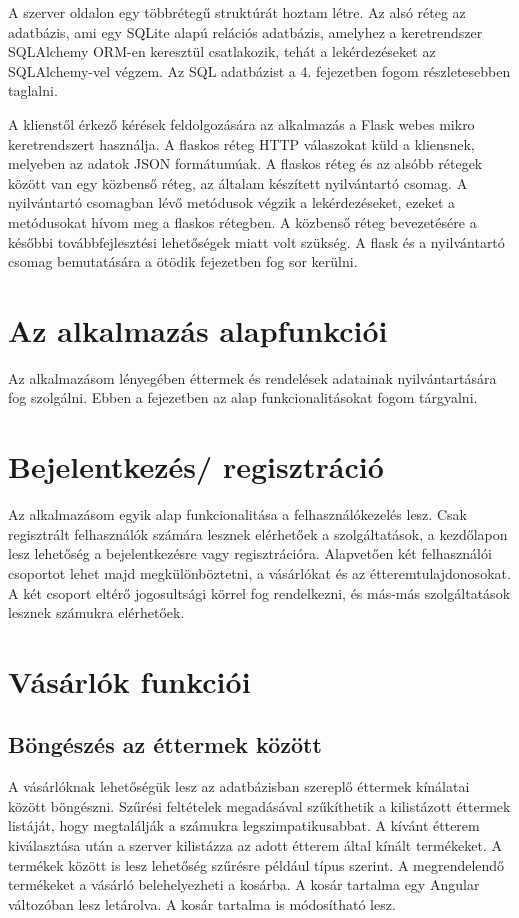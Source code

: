 A szerver oldalon egy többrétegű struktúrát hoztam létre. Az alsó réteg az adatbázis, ami egy SQLite alapú relációs adatbázis, amelyhez a keretrendszer SQLAlchemy ORM-en keresztül csatlakozik, tehát a lekérdezéseket az SQLAlchemy-vel végzem. Az SQL adatbázist a 4. fejezetben fogom részletesebben taglalni.

A klienstől érkező kérések feldolgozására az alkalmazás a Flask webes mikro keretrendszert használja. A flaskos réteg HTTP válaszokat küld a kliensnek, melyeben az adatok JSON formátumúak. A flaskos réteg és az alsóbb rétegek között van egy közbenső réteg, az általam készített nyilvántartó csomag. A nyilvántartó csomagban lévő metódusok végzik a lekérdezéseket, ezeket a metódusokat hívom meg a flaskos rétegben. A közbenső réteg bevezetésére a későbbi továbbfejlesztési lehetőségek miatt volt szükség. A flask és a nyilvántartó csomag bemutatására a ötödik fejezetben fog sor kerülni.

\section{Az alkalmazás alapfunkciói}

Az alkalmazásom lényegében éttermek és rendelések adatainak nyilvántartására fog szolgálni. Ebben a fejezetben az alap funkcionalitásokat fogom tárgyalni.

\section{Bejelentkezés/ regisztráció}

Az alkalmazásom egyik alap funkcionalitása a felhasználókezelés lesz. Csak regisztrált felhasználók számára lesznek elérhetőek a szolgáltatások, a kezdőlapon lesz lehetőség a bejelentkezésre vagy regisztrációra. Alapvetően két felhasználói csoportot lehet majd megkülönböztetni, a vásárlókat és az étteremtulajdonosokat. A két csoport eltérő jogosultsági körrel fog rendelkezni, és más-más szolgáltatások lesznek számukra elérhetőek.

\section{Vásárlók funkciói}

\subsection{Böngészés az éttermek között}

A vásárlóknak lehetőségük lesz az adatbázisban szereplő éttermek kínálatai között böngészni. Szűrési feltételek megadásával szűkíthetik a kilistázott éttermek listáját, hogy megtalálják a számukra legszimpatikusabbat.
A kívánt étterem kiválasztása után a szerver kilistázza az adott étterem által kínált termékeket. A termékek között is lesz lehetőség szűrésre például típus szerint. A megrendelendő termékeket a vásárló belehelyezheti a kosárba. A kosár tartalma egy Angular változóban lesz letárolva. A kosár tartalma is módosítható lesz.

